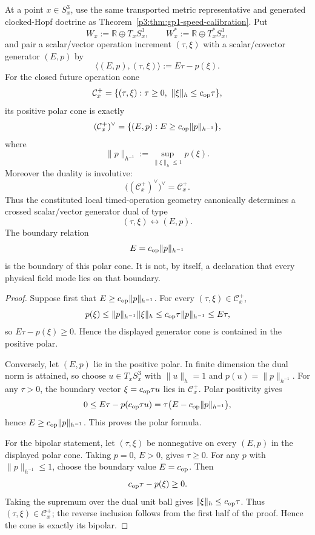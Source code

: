 \documentclass[12pt,a4paper]{article}
\begin{document}
\begin{theorem}
\label{p3:thm:gp1-operation-generator-polar-dual}
At a point \(x\in S^3_x\), use the same transported metric representative
and generated clocked-Hopf doctrine as
Theorem~\ref{p3:thm:gp1-speed-calibration}.  Put
\[
 W_x:=\mathbb R\oplus T_xS^3_x,
 \qquad
 W_x^*:=\mathbb R\oplus T_x^*S^3_x,
\]
and pair a scalar/vector operation increment \((\tau,\xi)\) with a
scalar/covector generator \((E,p)\) by
\[
 \langle(E,p),(\tau,\xi)\rangle
 :=E\tau-p(\xi).
\]
For the closed future operation cone
\[
 \mathcal C_x^+
 =\{(\tau,\xi):\tau\ge0,\ \|\xi\|_h\le c_{\rm op}\tau\},
\]
its positive polar cone is exactly
\[
 (\mathcal C_x^+)^\vee
 =\{(E,p):E\ge c_{\rm op}\|p\|_{h^{-1}}\},
\]
where
\[
 \|p\|_{h^{-1}}
 :=\sup_{\|\xi\|_h\le1}p(\xi).
\]
Moreover the duality is involutive:
\[
 \bigl((\mathcal C_x^+)^\vee\bigr)^\vee=\mathcal C_x^+.
\]
Thus the constituted local timed-operation geometry canonically determines a
crossed scalar/vector generator dual of type
\[
 (\tau,\xi)\longleftrightarrow(E,p).
\]
The boundary relation
\[
 E=c_{\rm op}\|p\|_{h^{-1}}
\]
is the boundary of this polar cone.  It is not, by itself, a declaration that
every physical field mode lies on that boundary.
\end{theorem}

\begin{proof}
Suppose first that \(E\ge c_{\rm op}\|p\|_{h^{-1}}\).  For every
\((\tau,\xi)\in\mathcal C_x^+\),
\[
 p(\xi)
 \le \|p\|_{h^{-1}}\|\xi\|_h
 \le c_{\rm op}\tau\|p\|_{h^{-1}}
 \le E\tau,
\]
so \(E\tau-p(\xi)\ge0\).  Hence the displayed generator cone is contained in
the positive polar.

Conversely, let \((E,p)\) lie in the positive polar.  In finite dimension the
dual norm is attained, so choose \(u\in T_xS^3_x\) with
\(\|u\|_h=1\) and \(p(u)=\|p\|_{h^{-1}}\).  For any \(\tau>0\), the
boundary vector \(\xi=c_{\rm op}\tau u\) lies in \(\mathcal C_x^+\).
Polar positivity gives
\[
 0\le E\tau-p(c_{\rm op}\tau u)
 =\tau\bigl(E-c_{\rm op}\|p\|_{h^{-1}}\bigr),
\]
hence \(E\ge c_{\rm op}\|p\|_{h^{-1}}\).  This proves the polar formula.

For the bipolar statement, let \((\tau,\xi)\) be nonnegative on every
\((E,p)\) in the displayed polar cone.  Taking \(p=0\), \(E>0\), gives
\(\tau\ge0\).  For any \(p\) with \(\|p\|_{h^{-1}}\le1\), choose the
boundary value \(E=c_{\rm op}\).  Then
\[
 c_{\rm op}\tau-p(\xi)\ge0.
\]
Taking the supremum over the dual unit ball gives
\(\|\xi\|_h\le c_{\rm op}\tau\).  Thus
\((\tau,\xi)\in\mathcal C_x^+\); the reverse inclusion follows from the
first half of the proof.  Hence the cone is exactly its bipolar.
\end{proof}
\end{document}
